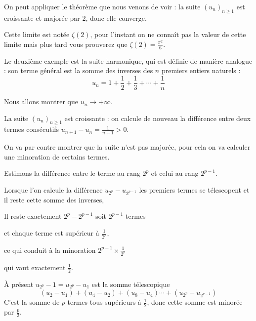 \change

On peut appliquer le théorème que nous venons de voir : 
la suite $(u_n)_{n\geq 1}$ est croissante et majorée par $2$, donc  elle converge.

\change

Cette limite est notée $\zeta(2)$, pour l'instant on ne connaît pas la valeur de
cette limite mais plus tard vous prouverez que $\zeta(2)=\frac{\pi^2}{6}$.


 \diapo


 Le deuxième exemple est la suite harmonique, qui est définie de manière analogue : 
 son terme général est la somme des inverses des 
 $n$ premiers entiers naturels :
 $$ u_n =1+\frac{1}{2} +\frac{1}{3}+\cdots+\frac{1}{n} $$

 \change

Nous allons montrer que $u_n \to +\infty$.

\change

La suite $(u_n)_{n\geq 1}$ est croissante :  
on calcule de nouveau la différence entre deux termes consécutifs $u_{n+1}-u_n= \frac{1}{n+1}>0$. 

\change

On va par contre montrer que la suite n'est pas majorée, 
pour cela on va calculer une minoration de certains termes.


\change


Estimons la différence entre
le terme au rang ${2^p}$ et celui au rang ${2^{p-1}}$.

\change

Lorsque l'on calcule la différence
$u_{2^p}-u_{2^{p-1}}$ les premiers termes se télescopent et il reste
cette somme des inverses, 

\change 

Il reste exactement $2^p-2^{p-1}$
soit $2^{p-1}$ termes 

\change

et chaque terme est supérieur à $\frac{1}{2^p}$, 

\change 

ce qui conduit à la minoration
$2^{p-1}\times \frac{1}{2^p}$ 


\change

qui vaut exactement $\frac{1}{2}$.

 
\change

À présent $u_{2^p}-1 = u_{2^p}-u_1$ est la somme télescopique 
$$(u_2 - u_1)+ (u_4 - u_2)+(u_8-u_4) \cdots +  (u_{2^p}-u_{2^{p-1}})$$ 
C'est la somme de $p$ termes tous supérieurs à $\frac{1}{2}$, 
donc cette somme est minorée par $\frac{p}{2}$.

